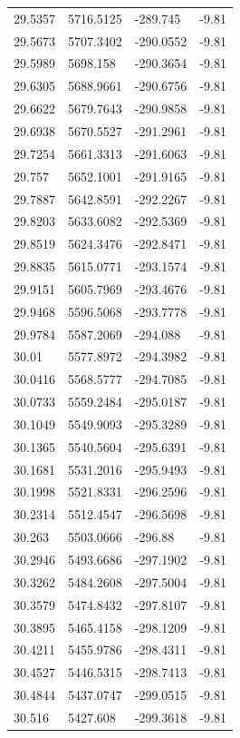 \begin{table}[H]
\begin{tabular}{llll}
29.5357 & 5716.5125 & -289.745 & -9.81 \\
29.5673 & 5707.3402 & -290.0552 & -9.81 \\
29.5989 & 5698.158 & -290.3654 & -9.81 \\
29.6305 & 5688.9661 & -290.6756 & -9.81 \\
29.6622 & 5679.7643 & -290.9858 & -9.81 \\
29.6938 & 5670.5527 & -291.2961 & -9.81 \\
29.7254 & 5661.3313 & -291.6063 & -9.81 \\
29.757 & 5652.1001 & -291.9165 & -9.81 \\
29.7887 & 5642.8591 & -292.2267 & -9.81 \\
29.8203 & 5633.6082 & -292.5369 & -9.81 \\
29.8519 & 5624.3476 & -292.8471 & -9.81 \\
29.8835 & 5615.0771 & -293.1574 & -9.81 \\
29.9151 & 5605.7969 & -293.4676 & -9.81 \\
29.9468 & 5596.5068 & -293.7778 & -9.81 \\
29.9784 & 5587.2069 & -294.088 & -9.81 \\
30.01 & 5577.8972 & -294.3982 & -9.81 \\
30.0416 & 5568.5777 & -294.7085 & -9.81 \\
30.0733 & 5559.2484 & -295.0187 & -9.81 \\
30.1049 & 5549.9093 & -295.3289 & -9.81 \\
30.1365 & 5540.5604 & -295.6391 & -9.81 \\
30.1681 & 5531.2016 & -295.9493 & -9.81 \\
30.1998 & 5521.8331 & -296.2596 & -9.81 \\
30.2314 & 5512.4547 & -296.5698 & -9.81 \\
30.263 & 5503.0666 & -296.88 & -9.81 \\
30.2946 & 5493.6686 & -297.1902 & -9.81 \\
30.3262 & 5484.2608 & -297.5004 & -9.81 \\
30.3579 & 5474.8432 & -297.8107 & -9.81 \\
30.3895 & 5465.4158 & -298.1209 & -9.81 \\
30.4211 & 5455.9786 & -298.4311 & -9.81 \\
30.4527 & 5446.5315 & -298.7413 & -9.81 \\
30.4844 & 5437.0747 & -299.0515 & -9.81 \\
30.516 & 5427.608 & -299.3618 & -9.81 \\

\end{tabular}
\end{table}
